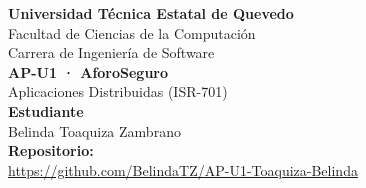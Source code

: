 \documentclass[12pt]{article}
\begin{document}
\begin{center}
{\Large\textbf{Universidad Técnica Estatal de Quevedo}}\\[6pt]
Facultad de Ciencias de la Computación\\
Carrera de Ingeniería de Software\\[22pt]
{\Large\textbf{AP-U1 · AforoSeguro}}\\[6pt]
Aplicaciones Distribuidas (ISR-701)\\[18pt]
\textbf{Estudiante}\\
Belinda Toaquiza Zambrano\\[18pt]
\textbf{Repositorio:}\\[6pt]
{\small\url{https://github.com/BelindaTZ/AP-U1-Toaquiza-Belinda}}
\end{center}
\end{document}
